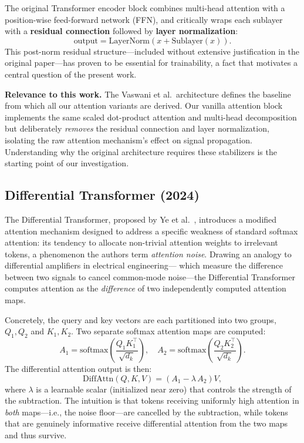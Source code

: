 \documentclass[12pt, a4paper]{article}
\begin{document}
The original Transformer encoder block combines multi-head attention with
a position-wise feed-forward network (FFN), and critically wraps each
sublayer with a \textbf{residual connection} followed by \textbf{layer
normalization}:
\begin{equation}
    \text{output} = \text{LayerNorm}(x + \text{Sublayer}(x)).
    \label{eq:post_ln}
\end{equation}
This post-norm residual structure---included without extensive
justification in the original paper---has proven to be essential for
trainability, a fact that motivates a central question of the present
work.

\textbf{Relevance to this work.} The Vaswani et al.\ architecture
defines the baseline from which all our attention variants are derived.
Our vanilla attention block implements the same scaled dot-product
attention and multi-head decomposition but deliberately \textit{removes}
the residual connection and layer normalization, isolating the raw
attention mechanism's effect on signal propagation. Understanding why
the original architecture requires these stabilizers is the starting
point of our investigation.

\subsection{Differential Transformer (2024)}

The Differential Transformer, proposed by Ye et
al.~\cite{diff_transformer}, introduces a modified attention mechanism
designed to address a specific weakness of standard softmax
attention: its tendency to allocate non-trivial attention weights to
irrelevant tokens, a phenomenon the authors term \textit{attention noise}.
Drawing an analogy to differential amplifiers in electrical engineering---
which measure the difference between two signals to cancel common-mode
noise---the Differential Transformer computes attention as the
\textit{difference} of two independently computed attention maps.

Concretely, the query and key vectors are each partitioned into two
groups, $Q_1, Q_2$ and $K_1, K_2$. Two separate softmax attention maps
are computed:
\begin{equation}
    A_1 = \text{softmax}\!\left(\frac{Q_1 K_1^\top}{\sqrt{d_k}}\right), \quad
    A_2 = \text{softmax}\!\left(\frac{Q_2 K_2^\top}{\sqrt{d_k}}\right).
    \label{eq:diff_attn_maps}
\end{equation}
The differential attention output is then:
\begin{equation}
    \text{DiffAttn}(Q, K, V) = \left(A_1 - \lambda\, A_2\right) V,
    \label{eq:diff_attn}
\end{equation}
where $\lambda$ is a learnable scalar (initialized near zero) that
controls the strength of the subtraction. The intuition is that tokens
receiving uniformly high attention in \textit{both} maps---i.e., the
noise floor---are cancelled by the subtraction, while tokens that are
genuinely informative receive differential attention from the two maps
and thus survive.
\end{document}
